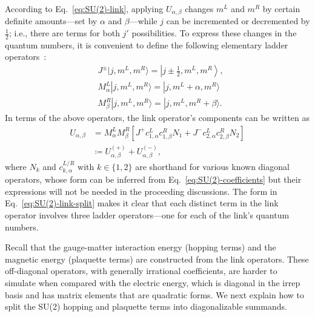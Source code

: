 \documentclass[aps,prd,twocolumn,showpacs,groupedaddress,superscriptaddress,nofootinbib,floatfix,preprintnumbers,longbibliography]{revtex4-1}
\begin{document}
According to Eq.~\eqref{eq:SU(2)-link}, applying $U_{\alpha, \beta}$ changes $m^L$ and $m^R$ by certain definite amounts---set by $\alpha$ and $\beta$---while $j$ can be incremented or decremented by $\tfrac{1}{2}$; i.e., there are terms for both $j'$ possibilities. To express these changes in the quantum numbers, it is convenient to define the following elementary ladder operators~\cite{Byrnes:2005qx}:
%
\begin{align}
\label{eq: Jpm action}
&J^{\pm} | j,m^L,m^R   \rangle = \left |  j\pm \tfrac{1}{2},m^L,m^R   \right \rangle, \\
&M_\alpha^L | j,m^L,m^R   \rangle =  |j, m^L+\alpha ,m^R  \rangle
\label{eq: M^L action}
\\
&M_\beta^R | j,m^L,m^R   \rangle =  |j, m^L ,m^R + \beta  \rangle.
\label{eq: M^R action}
\end{align}
%
In terms of the above operators, the link operator's components can be written as
%
\begin{align}
U_{\alpha,\beta} & =
M_{\alpha}^L M_{\beta}^R \left[ J^+ c_{1, \alpha}^L c_{1, \beta}^R  N_1 + J^- c_{2, \alpha}^L c_{2, \beta}^R  N_2 \right]
\nonumber\\
& \coloneq U_{\alpha,\beta}^{(+)} + U_{\alpha,\beta}^{(-)},
\label{eq:SU(2)-link-split}
\end{align}
%
where $N_k$ and $c_{k,\alpha}^{L/R}$ with $k \in \{1,2\}$ are shorthand for various known diagonal operators, whose form can be inferred from Eq.~\eqref{eq:SU(2)-coefficients} but their expressions will not be needed in the proceeding discussions. The form in Eq.~\eqref{eq:SU(2)-link-split} makes it clear that each distinct term in the link operator involves three ladder operators---one for each of the link's quantum numbers.

Recall that the gauge-matter interaction energy (hopping terms) and the magnetic energy (plaquette terms) are constructed from the link operators. These off-diagonal operators, with generally irrational coefficients, are harder to simulate when compared with the electric energy, which is diagonal in the irrep basis and has matrix elements that are quadratic forms. We next explain how to split the SU(2) hopping and plaquette terms into diagonalizable summands.



\end{document}
